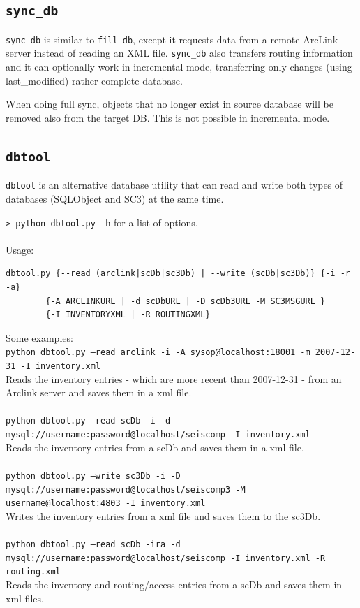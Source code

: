\documentclass[11pt,a4paper,titlepage]{article}
\newcommand{\cmd}[1]{\texttt{#1}}
\begin{document}
\subsection{\cmd{sync\_db}}

\cmd{sync\_db} is similar to \cmd{fill\_db}, except it requests data from a
remote ArcLink server instead of reading an XML file. \cmd{sync\_db} also
transfers routing information and it can optionally work in incremental
mode, transferring only changes (using last\_modified) rather complete
database.

When doing full sync, objects that no longer exist in source database will
be removed also from the target DB. This is not possible in incremental
mode.


\subsection{\cmd{dbtool}}

\cmd{dbtool} is an alternative database utility that can read and write
both types of databases (SQLObject and SC3) at the same time.

\texttt{> python dbtool.py -h} for a list of options.\\
\\
Usage:
\begin{verbatim}
dbtool.py {--read (arclink|scDb|sc3Db) | --write (scDb|sc3Db)} {-i -r -a}
		{-A ARCLINKURL | -d scDbURL | -D scDb3URL -M SC3MSGURL }
		{-I INVENTORYXML | -R ROUTINGXML}
\end{verbatim}
Some examples: \\
\texttt{python dbtool.py --read arclink -i -A sysop@localhost:18001 -m 2007-12-31 -I inventory.xml} \\
Reads the inventory entries - which are more recent than 2007-12-31 - from an Arclink server and saves them in a xml file. \\
\\
\texttt{python dbtool.py --read scDb -i -d mysql://username:password@localhost/seiscomp -I inventory.xml} \\
Reads the inventory entries from a scDb and saves them in a xml file. \\
\\
\texttt{python dbtool.py --write sc3Db -i -D mysql://username:password@localhost/seiscomp3 -M username@localhost:4803 -I inventory.xml} \\
Writes the inventory entries from a xml file and saves them to the sc3Db. \\
\\
\texttt{python dbtool.py --read scDb -ira -d mysql://username:password@localhost/seiscomp -I inventory.xml -R routing.xml} \\
Reads the inventory and routing/access entries from a scDb and saves them in xml files. \\
\end{document}
